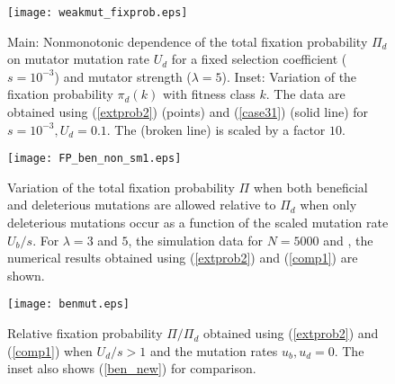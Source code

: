\documentclass[preprint,12pt,number]{elsarticle}
\begin{document}
\clearpage

\begin{figure} 
\begin{center}  
\texttt{[image: weakmut\_fixprob.eps]}
\end{center}
\caption{Main: Nonmonotonic dependence of the total fixation probability $\Pi_d$ on mutator mutation rate $U_d$ for a fixed selection coefficient ($s=10^{-3}$) and mutator strength ($\lambda=5$). Inset: Variation of the fixation probability $\pi_d(k)$ with fitness class $k$. The data are obtained using (\ref{extprob2}) (points) and (\ref{case31}) (solid line) for $s=10^{-3}, U_d=0.1$. The  {(broken line)} is scaled by a factor $10$.}
\label{fig_Qkprobw}
\end{figure}

\clearpage


\begin{figure} 
\begin{center}  
\texttt{[image: FP\_ben\_non\_sm1.eps]}        
 \end{center}
\caption{Variation of the total fixation probability $\Pi$ when both beneficial and deleterious mutations are allowed relative to  $\Pi_d$ when only deleterious mutations occur as a function of the scaled mutation rate $U_b/s$.  For $\lambda=3$ and $5$, the simulation data for $N=5000$  and , the numerical results obtained using (\ref{extprob2}) and (\ref{comp1}) are shown.}
\label{fig_benmut}
\end{figure}

\clearpage

\begin{figure} 
\begin{center}  
\texttt{[image: benmut.eps]}        
 \end{center}
\caption{Relative fixation probability $\Pi/\Pi_d$ obtained using (\ref{extprob2}) and (\ref{comp1}) when $U_d/s > 1$ and the mutation rates $u_b, u_d=0$. The inset also shows (\ref{ben_new}) for comparison.}
\label{fig_benmut2}
\end{figure}

\clearpage
\end{document}
